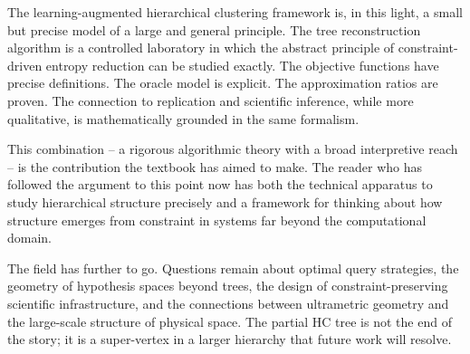 \medskip

The learning-augmented hierarchical clustering framework is, in this light, a small but precise model of a large and general principle. The tree reconstruction algorithm is a controlled laboratory in which the abstract principle of constraint-driven entropy reduction can be studied exactly. The objective functions have precise definitions. The oracle model is explicit. The approximation ratios are proven. The connection to replication and scientific inference, while more qualitative, is mathematically grounded in the same formalism.

This combination -- a rigorous algorithmic theory with a broad interpretive reach -- is the contribution the textbook has aimed to make. The reader who has followed the argument to this point now has both the technical apparatus to study hierarchical structure precisely and a framework for thinking about how structure emerges from constraint in systems far beyond the computational domain.

\bigskip
\noindent
The field has further to go. Questions remain about optimal query strategies, the geometry of hypothesis spaces beyond trees, the design of constraint-preserving scientific infrastructure, and the connections between ultrametric geometry and the large-scale structure of physical space. The partial HC tree is not the end of the story; it is a super-vertex in a larger hierarchy that future work will resolve.
